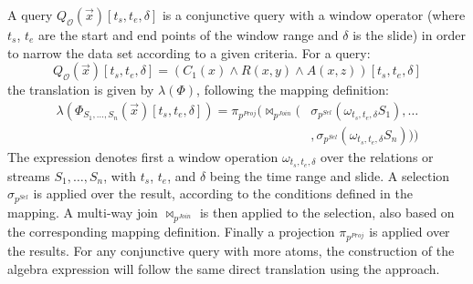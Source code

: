 A query $Q_{\mathcal{O}}(\vec{x})[t_s,t_e,\delta]$ is a conjunctive query with a window operator (where $t_s$, $t_e$ are the start and end points of the window range and $\delta$ is the slide) in order to narrow the data set according to a given criteria. 
For a query:
\begin{equation*}
  Q_{\mathcal{O}}(\vec{x})[t_s,t_e,\delta] = (C_1(x) \wedge R(x,y) \wedge A(x,z)) [t_s,t_e,\delta]
\end{equation*}
the translation is given by $\lambda(\Phi)$, following the mapping definition:
\begin{align*}
\lambda(\Phi_{S_1,\ldots,S_n}(\vec{x})[t_s,t_e,\delta])=\pi_{p^{Proj}}(\Join_{p^{Join}}
(&\sigma_{p^{Sel}}(\omega_{t_s,t_e,\delta}S_1),\dots \\ &,\sigma_{p^{Sel}}(\omega_{t_s,t_e,\delta}S_n)))
\end{align*}
The expression denotes first a window operation $\omega_{t_s,t_e,\delta}$ over the relations or streams $S_1,\dots, S_n$, with $t_s$, $t_e$, and $\delta$ being the time range and slide. 
A selection $\sigma_{p^{Sel}}$ is applied over the result, according to the conditions defined in the mapping. 
A multi-way join $\Join_{p^{Join}}$ is then applied to the selection, also based on the corresponding mapping definition. 
Finally a projection $\pi_{p^{Proj}}$ is applied over the results. 
For any conjunctive query with more atoms, the construction of the algebra expression will follow the same direct translation using the \gav approach.
%
